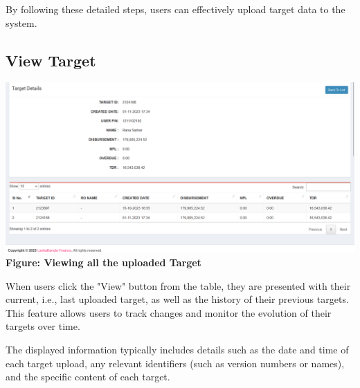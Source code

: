 \documentclass{article}
\begin{document}
By following these detailed steps, users can effectively upload target data to the system.

\subsection{View Target}
\begin{center}
\includegraphics[width=1.0\textwidth]{image/setting_target_single_view.png}
\textbf{Figure: Viewing all the uploaded Target}
\end{center}


When users click the "View" button from the table, they are presented with their current, i.e., last uploaded target, as well as the history of their previous targets. This feature allows users to track changes and monitor the evolution of their targets over time.

The displayed information typically includes details such as the date and time of each target upload, any relevant identifiers (such as version numbers or names), and the specific content of each target.

\end{document}
